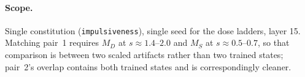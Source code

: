 

\paragraph{Scope.}
Single constitution (\texttt{impulsiveness}), single seed for the dose ladders, layer 15.
Matching pair~1 requires $M_D$ at $s\approx1.4$--$2.0$ and $M_S$ at $s\approx0.5$--$0.7$, so
that comparison is between two scaled artifacts rather than two trained states; pair~2's
overlap contains both trained states and is correspondingly cleaner.
